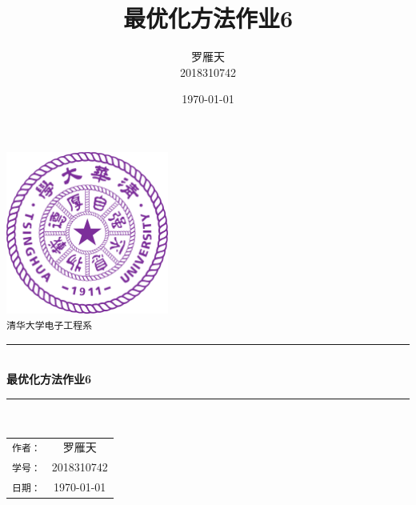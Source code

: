 \documentclass[a4paper]{article}
\title{最优化方法作业6}
\author{罗雁天 \\
2018310742}
\date{\today}
\begin{document}
\newcommand{\HRule}{\rule{\linewidth}{0.5mm}}
\begin{titlepage}
	\begin{center}
		\includegraphics[width=0.4\textwidth]{Tsinghua2.png}\\[1cm]
		\textsc{\Large \texttt{清华大学电子工程系}}\\[1cm]
		\HRule \\[1cm]
		{\Huge \bfseries 最优化方法作业6}\\[0.4cm]
		\HRule \\[3.5cm]
		\begin{minipage}{0.4\textwidth}
			\begin{center}
				\Large
				\begin{tabular}{cc}
					\texttt{作者：} & 罗雁天 \\[0.5cm]
					\texttt{学号：} & 2018310742 \\[0.5cm]
					\texttt{日期：} & \today
				\end{tabular}
			\end{center}
		\end{minipage}
		\vfill
	\end{center}
\end{titlepage}
\end{document}
